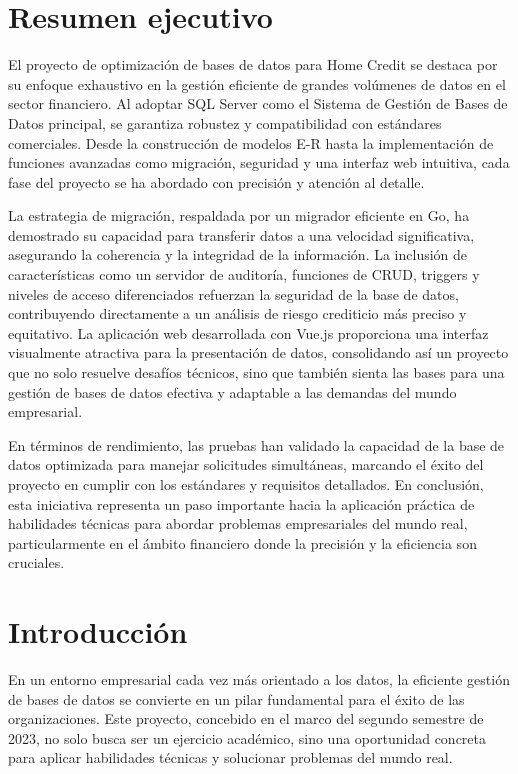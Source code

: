 \section{Resumen ejecutivo}

El proyecto de optimización de bases de datos para Home Credit se destaca por
su enfoque exhaustivo en la gestión eficiente de grandes volúmenes de datos en
el sector financiero. Al adoptar SQL Server como el Sistema de Gestión de Bases
de Datos principal, se garantiza robustez y compatibilidad con estándares
comerciales. Desde la construcción de modelos E-R hasta la implementación de
funciones avanzadas como migración, seguridad y una interfaz web intuitiva,
cada fase del proyecto se ha abordado con precisión y atención al detalle.

La estrategia de migración, respaldada por un migrador eficiente en Go, ha
demostrado su capacidad para transferir datos a una velocidad significativa,
asegurando la coherencia y la integridad de la información. La inclusión de
características como un servidor de auditoría, funciones de CRUD, triggers y
niveles de acceso diferenciados refuerzan la seguridad de la base de datos,
contribuyendo directamente a un análisis de riesgo crediticio más preciso y
equitativo. La aplicación web desarrollada con Vue.js proporciona una interfaz
visualmente atractiva para la presentación de datos, consolidando así un
proyecto que no solo resuelve desafíos técnicos, sino que también sienta las
bases para una gestión de bases de datos efectiva y adaptable a las demandas
del mundo empresarial.

En términos de rendimiento, las pruebas han validado la capacidad de la base de
datos optimizada para manejar solicitudes simultáneas, marcando el éxito del
proyecto en cumplir con los estándares y requisitos detallados. En conclusión,
esta iniciativa representa un paso importante hacia la aplicación práctica de
habilidades técnicas para abordar problemas empresariales del mundo real,
particularmente en el ámbito financiero donde la precisión y la eficiencia son
cruciales.

\newpage

\section{Introducción}

En un entorno empresarial cada vez más orientado a los datos, la eficiente
gestión de bases de datos se convierte en un pilar fundamental para el éxito de
las organizaciones. Este proyecto, concebido en el marco del segundo semestre
de 2023, no solo busca ser un ejercicio académico, sino una oportunidad
concreta para aplicar habilidades técnicas y solucionar problemas del mundo
real.

